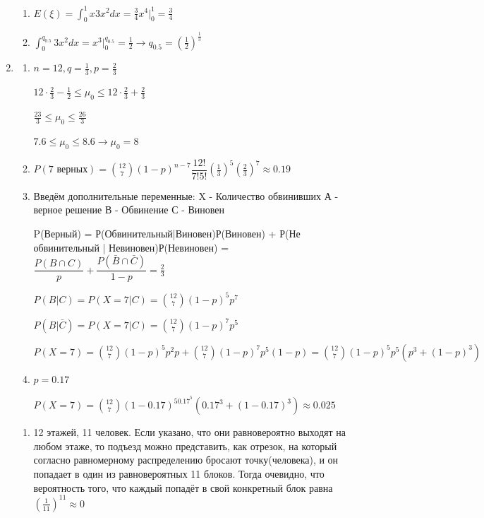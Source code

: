 \begin{enumerate}
\begin{enumerate}
\item

$ E(\xi) = \int_{0}^{1} x 3x^2 dx = \frac{3}{4} x^4 \bigg|_0^1 = \frac{3}{4}$

\item

$ \int_{0}^{q_{0.5}}3 x^2 dx = x^3 \bigg |_0^{q_{0.5}} = \frac{1}{2} \to q_{0.5} = \left(\frac{1}{2}\right)^\frac{1}{3} $
\end{enumerate}

\item 
\begin{enumerate}
\item
$ n = 12, q = \frac{1}{3}, p = \frac{2}{3} $


$ 12 \cdot \frac{2}{3}  - \frac{1}{2} \le \mu_0 \le 12 \cdot \frac{2}{3} + \frac{2}{3} $

$ \frac{23}{3} \le \mu_0 \le \frac{26}{3} $

$ 7.6 \le \mu_0 \le 8.6 \to \mu_0 = 8$ 

\item 

$ P(7  \text{ верных}) = \binom{12}{7} (1 - p)^{n - 7}\dfrac{12!}{7!5!}\left(\frac{1}{3}\right)^5\left(\frac{2}{3}\right)^7 \approx 0.19$

\item 

Введём дополнительные переменные:
X - Количество обвинивших
А - верное решение
В - Обвинение
С - Виновен

P(Верный) = Р(Обвинительный|Виновен)Р(Виновен) + Р(Не обвинительный | Невиновен)Р(Невиновен) =
$ \dfrac{P(B\cap C)}{p} + \dfrac{P(\bar{B}\cap \bar{C})}{1 - p} = \frac{2}{3}$ 

$ P(B|C) = P(X = 7|C) = \binom{12}{7}(1-p)^5p^7 $

$ P(B|\bar{C}) = P(X = 7|C) = \binom{12}{7}(1-p)^7p^5 $

$ P(X = 7) = \binom{12}{7}(1-p)^5p^2p + \binom{12}{7}(1-p)^7p^5(1-p) = \binom{12}{7}(1-p)^5p^5(p^3 + (1-p)^3)$

\item 
$ p = 0.17 $

$ P(X = 7)  = \binom{12}{7}(1-0.17)^50.17^5(0.17^3 + (1-0.17)^3) \approx 0.025$

\end{enumerate}

\begin{enumerate}
	\item
	12 этажей, 11 человек.
	Если указано, что они равновероятно выходят на любом этаже, то подъезд можно представить, как отрезок, на который согласно равномерному распределению бросают точку(человека), и он попадает в один из равновероятных 11 блоков. Тогда очевидно, что вероятность того, что каждый попадёт в свой конкретный блок равна $\left(\frac{1}{11}\right) ^{11} \approx 0 $ 
	

\end{enumerate}
\end{enumerate}
